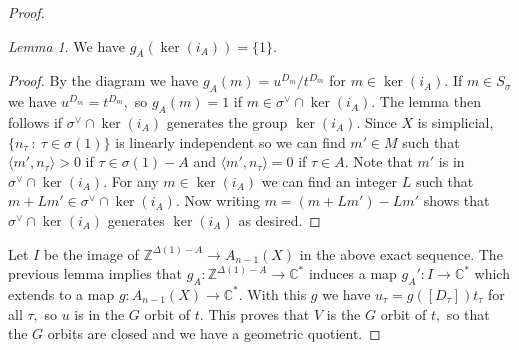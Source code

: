 \documentclass[BSc]{usydthesis}
\numberwithin{equation}{chapter}
\theoremstyle{remark}
\newtheorem{Lemma}[equation]{Lemma}
\newcommand{\C}{\mathbb{C}}
\newcommand{\Z}{\mathbb{Z}}
\newcommand{\V}{\vee}
\begin{document}
\begin{proof}
\begin{Lemma}
 We have $g_A( \operatorname{ker}(i_A)) = \{1\}.$
\end{Lemma}
 \begin{proof}
  By the diagram we have $g_A(m) = u^{D_m}/t^{D_m}$ for $m\in \operatorname{ker}(i_A).$ If $m\in S_{\sigma}$ we have $u^{D_m} = t^{D_m},$ so $g_A(m)=1$ if $m\in \sigma^{\V}\cap \operatorname{ker}(i_A).$ The lemma then follows if $\sigma^{\V}\cap \operatorname{ker}(i_A)$ generates the group $\operatorname{ker}(i_A).$ Since $X$ is simplicial, $\{ n_{\tau} \ : \ \tau\in \sigma(1) \}$ is linearly independent so we can find $m'\in M$ such that $\langle m', n_{\tau} \rangle > 0 $ if $\tau \in \sigma(1)-A$ and $\langle m', n_{\tau} \rangle =0$ if $\tau \in A.$ Note that $m'$ is in $\sigma^{\V}\cap \operatorname{ker}(i_A).$ For any $m\in \operatorname{ker}(i_A)$ we can find an integer $L$ such that $m+Lm' \in \sigma^{\V}\cap \operatorname{ker}(i_A).$ Now writing $m=(m+Lm')-Lm'$ shows that $\sigma^{\V}\cap \operatorname{ker}(i_A)$ generates $\operatorname{ker}(i_A)$ as desired.
  \end{proof}

Let $I$ be the image of $\Z^{\Delta(1)-A}\to A_{n-1}(X)$ in the above exact sequence. The previous lemma implies that $g_A: \Z^{\Delta(1)-A}\to \C^*$ induces a map $g_A': I \to \C^*$ which extends to a map $g:A_{n-1}(X) \to \C^*.$ With this $g$ we have $u_{\tau} = g( [D_{\tau}]) t_{\tau}$ for all $\tau,$ so $u$ is in the $G$ orbit of $t.$ This proves that $V$ is the $G$ orbit of $t,$ so that the $G$ orbits are closed and we have a geometric quotient. 

\end{proof}
\end{document}
